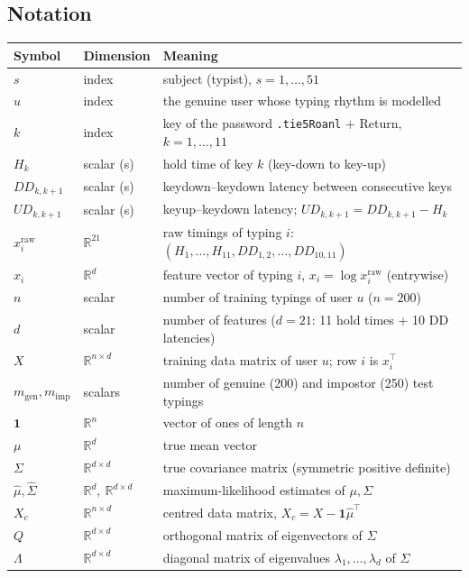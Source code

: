 \documentclass[11pt]{article}
\theoremstyle{definition}
\newcommand{\R}{\mathbb{R}}
\newcommand{\T}{^{\top}}
\begin{document}
\subsection{Notation}
\begin{center}
\small
\begin{tabular}{@{}lll@{}}
\toprule
Symbol & Dimension & Meaning \\
\midrule
$s$ & index & subject (typist), $s=1,\dots,51$ \\
$u$ & index & the genuine user whose typing rhythm is modelled \\
$k$ & index & key of the password \texttt{.tie5Roanl} + Return, $k=1,\dots,11$ \\
$H_k$ & scalar (s) & hold time of key $k$ (key-down to key-up) \\
$DD_{k,k+1}$ & scalar (s) & keydown--keydown latency between consecutive keys \\
$UD_{k,k+1}$ & scalar (s) & keyup--keydown latency; $UD_{k,k+1}=DD_{k,k+1}-H_k$ \\
$x_i^{\text{raw}}$ & $\R^{21}$ & raw timings of typing $i$: $(H_1,\dots,H_{11},DD_{1,2},\dots,DD_{10,11})$ \\
$x_i$ & $\R^{d}$ & feature vector of typing $i$, $x_i=\log x_i^{\text{raw}}$ (entrywise) \\
$n$ & scalar & number of training typings of user $u$ ($n=200$) \\
$d$ & scalar & number of features ($d=21$: 11 hold times + 10 DD latencies) \\
$X$ & $\R^{n\times d}$ & training data matrix of user $u$; row $i$ is $x_i\T$ \\
$m_{\text{gen}},m_{\text{imp}}$ & scalars & number of genuine (200) and impostor (250) test typings \\
$\mathbf 1$ & $\R^{n}$ & vector of ones of length $n$ \\
$\mu$ & $\R^{d}$ & true mean vector \\
$\Sigma$ & $\R^{d\times d}$ & true covariance matrix (symmetric positive definite) \\
$\hat\mu,\hat\Sigma$ & $\R^d,\ \R^{d\times d}$ & maximum-likelihood estimates of $\mu,\Sigma$ \\
$X_c$ & $\R^{n\times d}$ & centred data matrix, $X_c=X-\mathbf 1\hat\mu\T$ \\
$Q$ & $\R^{d\times d}$ & orthogonal matrix of eigenvectors of $\Sigma$ \\
$\Lambda$ & $\R^{d\times d}$ & diagonal matrix of eigenvalues $\lambda_1,\dots,\lambda_d$ of $\Sigma$ \\

\end{tabular}
\end{center}
\end{document}

